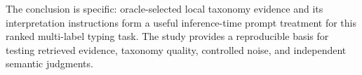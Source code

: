 The conclusion is specific: oracle-selected local taxonomy evidence and its interpretation instructions form a useful inference-time prompt treatment for this ranked multi-label typing task. The study provides a reproducible basis for testing retrieved evidence, taxonomy quality, controlled noise, and independent semantic judgments.

